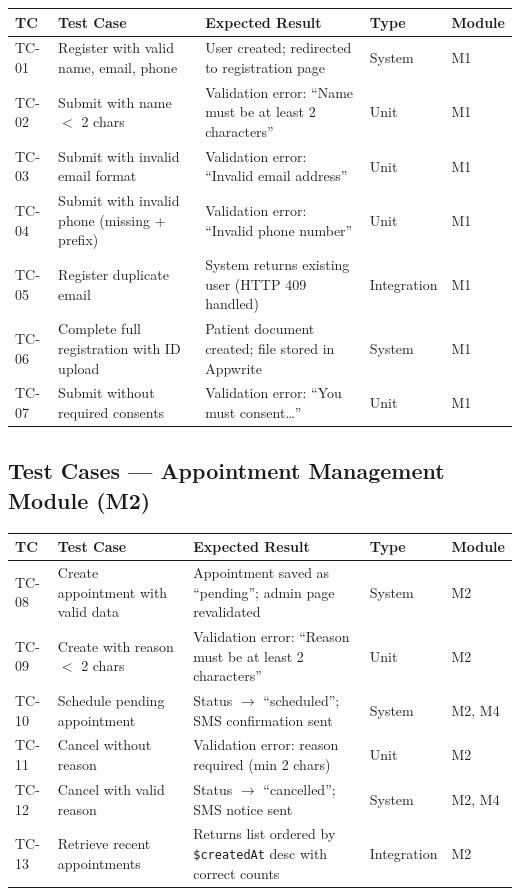 \documentclass[11pt,a4paper]{article}
\begin{document}
\begin{longtable}{|p{1cm}|p{3.2cm}|p{4.2cm}|p{2.2cm}|p{1.5cm}|}
\hline
\textbf{TC} & \textbf{Test Case} & \textbf{Expected Result} & \textbf{Type} & \textbf{Module} \\
\hline
TC-01 & Register with valid name, email, phone & User created; redirected to registration page & System & M1 \\
\hline
TC-02 & Submit with name $<$ 2 chars & Validation error: ``Name must be at least 2 characters'' & Unit & M1 \\
\hline
TC-03 & Submit with invalid email format & Validation error: ``Invalid email address'' & Unit & M1 \\
\hline
TC-04 & Submit with invalid phone (missing + prefix) & Validation error: ``Invalid phone number'' & Unit & M1 \\
\hline
TC-05 & Register duplicate email & System returns existing user (HTTP 409 handled) & Integration & M1 \\
\hline
TC-06 & Complete full registration with ID upload & Patient document created; file stored in Appwrite & System & M1 \\
\hline
TC-07 & Submit without required consents & Validation error: ``You must consent\ldots'' & Unit & M1 \\
\hline
\end{longtable}

\subsection{Test Cases --- Appointment Management Module (M2)}

\begin{longtable}{|p{1cm}|p{3.2cm}|p{4.2cm}|p{2.2cm}|p{1.5cm}|}
\hline
\textbf{TC} & \textbf{Test Case} & \textbf{Expected Result} & \textbf{Type} & \textbf{Module} \\
\hline
TC-08 & Create appointment with valid data & Appointment saved as ``pending''; admin page revalidated & System & M2 \\
\hline
TC-09 & Create with reason $<$ 2 chars & Validation error: ``Reason must be at least 2 characters'' & Unit & M2 \\
\hline
TC-10 & Schedule pending appointment & Status $\rightarrow$ ``scheduled''; SMS confirmation sent & System & M2, M4 \\
\hline
TC-11 & Cancel without reason & Validation error: reason required (min 2 chars) & Unit & M2 \\
\hline
TC-12 & Cancel with valid reason & Status $\rightarrow$ ``cancelled''; SMS notice sent & System & M2, M4 \\
\hline
TC-13 & Retrieve recent appointments & Returns list ordered by \texttt{\$createdAt} desc with correct counts & Integration & M2 \\
\hline
\end{longtable}
\end{document}
